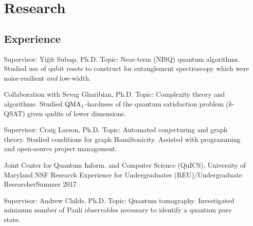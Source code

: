 \documentclass[11pt,letterpaper,serif]{moderncv}
\begin{document}
\section{Research}
\subsection{Experience}
{
	\begin{adjustwidth}{.25in}{}		
		Supervisor: Yi\u{g}it Suba\c{s}\i, Ph.D. \newline
		Topic: Near-term (NISQ) quantum algorithms. Studied use of qubit resets to construct for entanglement spectroscopy which were noise-resilient \textit{and} low-width.
	\end{adjustwidth}
}

{	
	\begin{adjustwidth}{.25in}{}
		Collaboration with Sevag Gharibian, Ph.D. \newline
		Topic: Complexity theory and algorithms. Studied $\textup{QMA}_{1}$-hardness of the quantum satisfaction problem ($k$-QSAT) given qudits of lower dimensions.
	\end{adjustwidth}
}

{	
	\begin{adjustwidth}{.25in}{}
		Supervisor: Craig Larson, Ph.D. \newline
		Topic: Automated conjecturing and graph theory. Studied conditions for graph Hamiltonicity. Assisted with programming and open-source project management.
	\end{adjustwidth}
}

\cventry{}
{\small Joint Center for Quantum Inform. and Computer Science (QuICS), University of Maryland}
{NSF Research Experience for Undergraduates (REU)/Undergraduate Researcher}{Summer 2017}{}
{	
	\begin{adjustwidth}{.25in}{}
		Supervisor: Andrew Childs, Ph.D. \newline
		Topic: Quantum tomography. Investigated minimum number of Pauli observables necessary to identify a quantum pure state.
	\end{adjustwidth}
}
\end{document}
